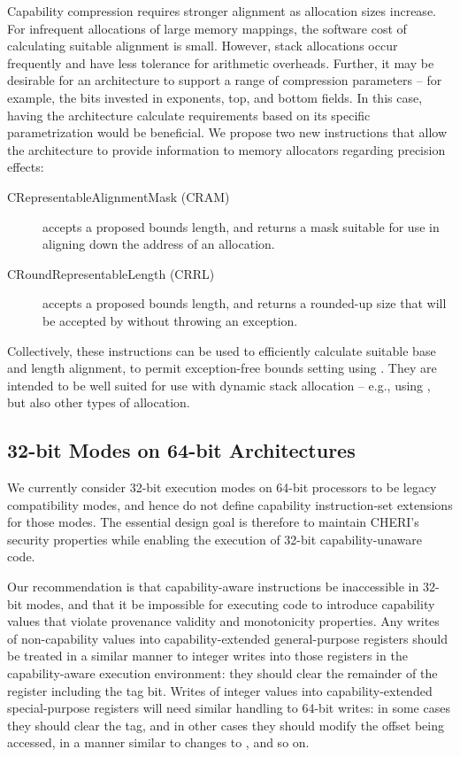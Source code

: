 Capability compression requires stronger alignment as allocation sizes
increase.
For infrequent allocations of large memory mappings, the software cost of
calculating suitable alignment is small.
However, stack allocations occur frequently and have less tolerance for
arithmetic overheads.
Further, it may be desirable for an architecture to support a range of
compression parameters -- for example, the bits invested in exponents, top,
and bottom fields.
In this case, having the architecture calculate requirements based on its
specific parametrization would be beneficial.
We propose two new instructions that allow the architecture to provide
information to memory allocators regarding precision effects:

\begin{description}
\item[CRepresentableAlignmentMask (CRAM)]  accepts a proposed
  bounds length, and returns a mask suitable for use in aligning down the
  address of an allocation.

\item[CRoundRepresentableLength (CRRL)]  accepts a proposed
  bounds length, and returns a rounded-up size that will be accepted by
   without throwing an exception.
\end{description}

Collectively, these instructions can be used to efficiently calculate
suitable base and length alignment, to permit exception-free bounds setting
using .
They are intended to be well suited for use with dynamic stack allocation --
e.g., using , but also other types of allocation.

\subsection{32-bit Modes on 64-bit Architectures}

We currently consider 32-bit execution modes on 64-bit processors to be legacy
compatibility modes, and hence do not define capability instruction-set
extensions for those modes.
The essential design goal is therefore to maintain CHERI's security properties
while enabling the execution of 32-bit capability-unaware code.

Our recommendation is that capability-aware instructions be inaccessible in
32-bit modes, and that it be impossible for executing code to introduce
capability values that violate provenance validity and monotonicity
properties.
Any writes of non-capability values into capability-extended general-purpose
registers should be treated in a similar manner to integer writes into those
registers in the capability-aware execution environment: they should clear the
remainder of the register including the tag bit.
Writes of integer values into capability-extended special-purpose registers
will need similar handling to 64-bit writes: in some cases they should clear
the tag, and in other cases they should modify the offset being accessed, in
a manner similar to changes to \PC{}, and so on.

